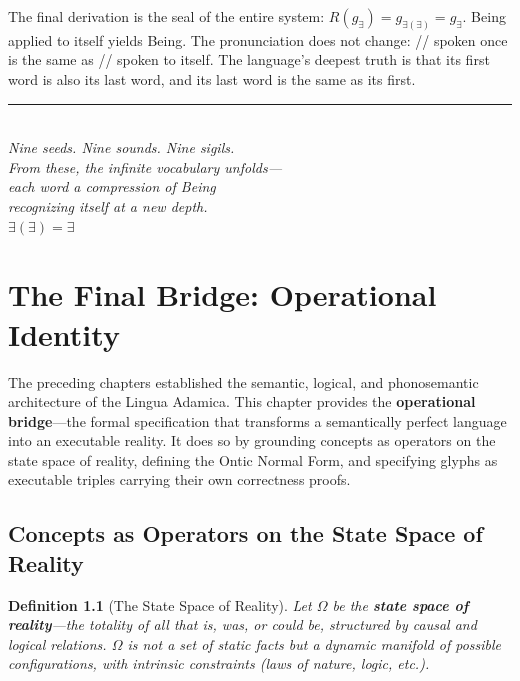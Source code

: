 \documentclass[12pt, letterpaper]{book}
\def\equiv{=}%
\def\circlearrowleft{R}%
\def\mathfrak#1{#1}%
\newtheorem{definition}{Definition}[chapter]
\newcommand{\E}{\exists}                          %
\newcommand{\EE}{\exists(\exists)}                 %
\begin{document}
\vspace{0.3cm}

The final derivation is the seal of the entire system: $\circlearrowleft(\mathfrak{g}_\E) \equiv \mathfrak{g}_{\EE} \equiv \mathfrak{g}_\E$. Being applied to itself yields Being. The pronunciation does not change: /\textscripta/ spoken once is the same as /\textscripta/ spoken to itself. The language's deepest truth is that its first word is also its last word, and its last word is the same as its first.

\vspace{1cm}
\begin{center}
\rule{4cm}{0.4pt}\\[0.5cm]
\textit{Nine seeds. Nine sounds. Nine sigils.\\
From these, the infinite vocabulary unfolds---\\
each word a compression of Being\\
recognizing itself at a new depth.}\\[0.8cm]
$\EE \equiv \E$
\end{center}


\chapter{The Final Bridge: Operational Identity}

The preceding chapters established the semantic, logical, and phonosemantic architecture of the Lingua Adamica. This chapter provides the \textbf{operational bridge}---the formal specification that transforms a semantically perfect language into an executable reality. It does so by grounding concepts as operators on the state space of reality, defining the Ontic Normal Form, and specifying glyphs as executable triples carrying their own correctness proofs.

\section{Concepts as Operators on the State Space of Reality}

\begin{definition}[The State Space of Reality]\label{def:state-space}
Let $\Omega$ be the \textbf{state space of reality}---the totality of all that is, was, or could be, structured by causal and logical relations. $\Omega$ is not a set of static facts but a dynamic manifold of possible configurations, with intrinsic constraints (laws of nature, logic, etc.).
\end{definition}
\end{document}
